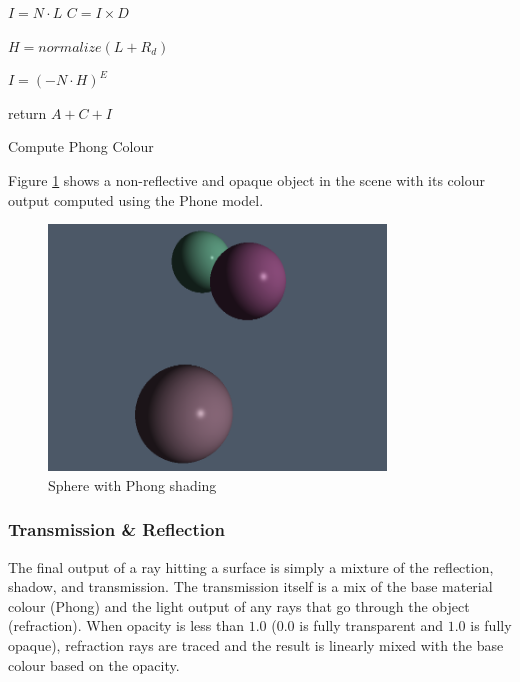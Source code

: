 \documentclass[final]{cmpreport}
\begin{document}
\begin{algorithm}
    \label{phongalgo}
    \SetAlgoLined

    $I = N \cdot L$ 
    $C = I \times D$ 

    $H = normalize(L + R_d)$ 

    $I = (-N \cdot H)^E$ 

    return $A + C + I$
    
    \caption{Compute Phong Colour}
\end{algorithm}

Figure \ref{phong_img} shows a non-reflective and opaque object in the scene with its colour output computed using the Phone model.

\begin{figure}
    \centering
    \includegraphics[width=0.8\textwidth]{img/phong.png}
    \caption{Sphere with Phong shading}
    \label{phong_img}
\end{figure}

\subsubsection{Transmission \& Reflection}

The final output of a ray hitting a surface is simply a mixture of the reflection, shadow, and transmission. The transmission itself is a mix of the base material colour (Phong) and the light output of any rays that go through the object (refraction). When opacity is less than $1.0$ ($0.0$ is fully transparent and $1.0$ is fully opaque), refraction rays are traced and the result is linearly mixed with the base colour based on the opacity.
\end{document}
